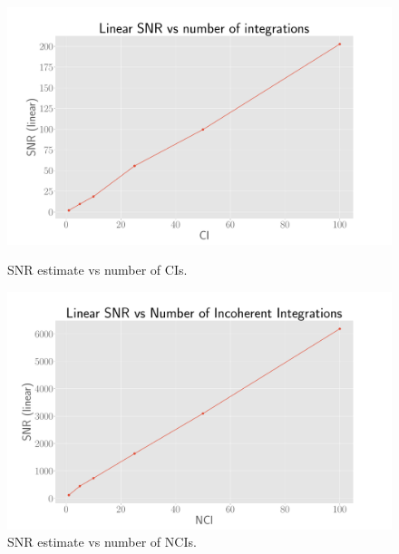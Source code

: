 \begin{figure}
    \centering
    \begin{minipage}{0.5\textwidth}
        \centering
        \includegraphics[width=\textwidth]{graphics/ci_snr.pdf}
        \caption{SNR estimate vs number of CIs.}\label{fig:snr_coh}
    \end{minipage}\hfill
    \begin{minipage}{0.5\textwidth}
        \centering
        \includegraphics[width=\textwidth]{graphics/nci_snr.pdf}
        \caption{SNR estimate vs number of NCIs.}\label{fig:nci_snr}
    \end{minipage}
\end{figure}
